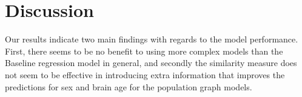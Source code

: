 \chapter{Discussion}
\label{chap:discussion}
    
Our results indicate two main findings with regards to the model performance. First, there seems to be no benefit to using more complex models than the Baseline regression model in general, and secondly the similarity measure does not seem to be effective in introducing extra information that improves the predictions for sex and brain age for the population graph models. 


